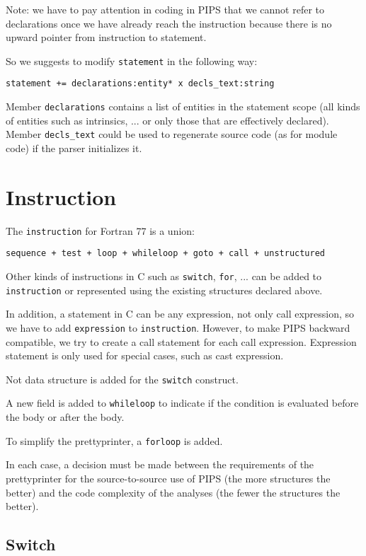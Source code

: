 \documentclass[a4paper]{report}
\begin{document}
Note: we have to pay attention in coding in PIPS that we cannot refer
to declarations once we have already reach the instruction because
there is no upward pointer from instruction to statement.

So we suggests to modify \verb/statement/ in the following way:

\verb/statement += declarations:entity* x decls_text:string/

Member \verb/declarations/ contains a list of entities in the
statement scope (all kinds of entities such as intrinsics, ... or only
those that are effectively declared).  Member \verb/decls_text/ could
be used to regenerate source code (as for module code) if the parser
initializes it.

\section{Instruction}

The \verb/instruction/ for Fortran 77 is a union:

\verb/sequence + test + loop + whileloop + goto + call + unstructured/

Other kinds of instructions in C such as \verb/switch/, \verb/for/,
... can be added to \verb/instruction/ or represented using the
existing structures declared above.

In addition, a statement in C can be any expression, not only call
expression, so we have to add \verb/expression/ to \verb/instruction/.
However, to make PIPS backward compatible, we try to create a call
statement for each call expression. Expression statement is only used
for special cases, such as cast expression.

Not data structure is added for the \verb/switch/ construct.

A new field is added to \verb/whileloop/ to indicate if the condition
is evaluated before the body or after the body.

To simplify the prettyprinter, a \verb/forloop/ is added.

In each case, a decision must be made between the requirements of the
prettyprinter for the source-to-source use of PIPS (the more
structures the better) and the code complexity of the analyses (the
fewer the structures the better).

\subsection{Switch}
\end{document}
